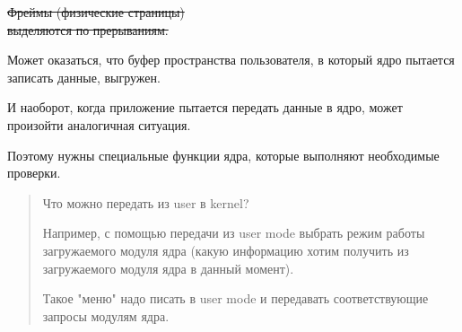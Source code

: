 \sout{Фреймы (физические страницы) \\ выделяются по прерываниям.}

Может оказаться, что буфер пространства пользователя, в который ядро пытается записать данные, выгружен.

И наоборот, когда приложение пытается передать данные в ядро, может произойти аналогичная ситуация.

Поэтому нужны специальные функции ядра, которые выполняют необходимые проверки.

\begin{quote}
Что можно передать из user в kernel?

Например, с помощью передачи из user mode выбрать режим работы загружаемого модуля ядра (какую информацию хотим получить из загружаемого модуля ядра в данный момент).

Такое "меню" надо писать в user mode и передавать соответствующие запросы модулям ядра.
\end{quote}








